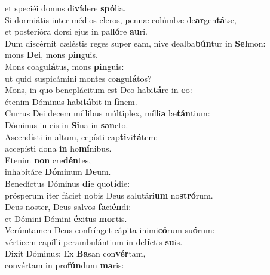 \oddverse et speciéi domus di\textbf{ví}dere \textbf{spó}lia.\\
\evenverse Si dormiátis inter médios cleros, pennæ colúmbæ de\textbf{ar}gen\textbf{tá}tæ,~\*\\
\evenverse et posterióra dorsi ejus in pal\textbf{ló}re \textbf{au}ri.\\
\oddverse Dum discérnit cæléstis reges super eam, nive dealba\textbf{bún}tur in \textbf{Sel}mon:~\*\\
\oddverse mons \textbf{De}i, mons \textbf{pin}guis.\\
\evenverse Mons coagu\textbf{lá}tus, mons \textbf{pin}guis:~\*\\
\evenverse ut quid suspicámini montes co\textbf{a}gu\textbf{lá}tos?\\
\oddverse Mons, in quo beneplácitum est Deo habi\textbf{tá}re in \textbf{e}o:~\*\\
\oddverse étenim Dóminus habi\textbf{tá}bit in \textbf{fi}nem.\\
\evenverse Currus Dei decem míllibus múltiplex, mílli\textbf{a} læ\textbf{tán}tium:~\*\\
\evenverse Dóminus in eis in \textbf{Si}na in \textbf{san}cto.\\
\oddverse Ascendísti in altum, cepísti cap\textbf{ti}vi\textbf{tá}tem:~\*\\
\oddverse accepísti dona \textbf{in} ho\textbf{mí}nibus.\\
\evenverse Etenim \textbf{non} cre\textbf{dén}tes,~\*\\
\evenverse inhabitáre \textbf{Dó}minum \textbf{De}um.\\
\oddverse Benedíctus Dóminus \textbf{di}e quo\textbf{tí}die:~\*\\
\oddverse prósperum iter fáciet nobis Deus salutári\textbf{um} no\textbf{stró}rum.\\
\evenverse Deus noster, Deus salvos \textbf{fa}ci\textbf{én}di:~\*\\
\evenverse et Dómini Dómini \textbf{é}xitus \textbf{mor}tis.\\
\oddverse Verúmtamen Deus confrínget cápita inimi\textbf{có}rum su\textbf{ó}rum:~\*\\
\oddverse vérticem capílli perambulántium in de\textbf{lí}ctis \textbf{su}is.\\
\evenverse Dixit Dóminus: Ex \textbf{Ba}san con\textbf{vér}tam,~\*\\
\evenverse convértam in pro\textbf{fún}dum \textbf{ma}ris:\\
